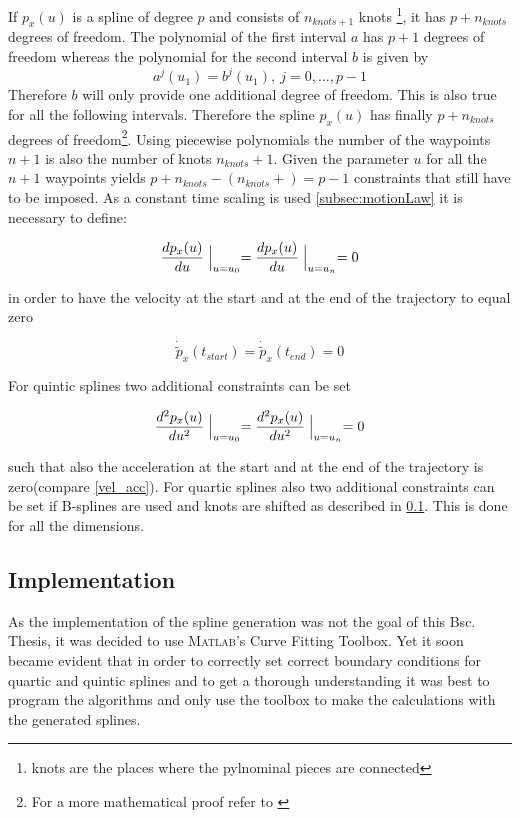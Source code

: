 If $p_x(u)$ is a spline of degree $p$ and consists of $n_{knots+1}$ knots \footnote{knots are the places where the pylnominal pieces are connected}, it has $p+n_{knots}$ degrees of freedom. The polynomial of the first interval $a$ has $p+1$ degrees of freedom whereas the polynomial for the second interval $b$ is given by
\begin{equation*}
a^{j}(u_1)=b^{j}(u_1),~j=0,...,p-1
\end{equation*}
Therefore $b$ will only provide one additional degree of freedom. This is also true for all the following intervals. Therefore the spline $p_x(u)$ has finally $p+n_{knots}$ degrees of freedom\footnote{For a more mathematical proof refer to \cite{dahmen}}. Using piecewise polynomials the number of the waypoints $n+1$ is also the number of knots $n_{knots}+1$. Given the parameter $u$ for all the $n+1$ waypoints yields $p+n_{knots}-(n_{knots}+) = p-1$ constraints that still have to be imposed. As a constant time scaling is used \ref{subsec:motionLaw} it is necessary to define:

\begin{equation*}
\frac{dp_x(u)}{du} \Bigm|_{u=u_0} = \frac{dp_x(u)}{du} \Bigm|_{u=u_n}=0
\end{equation*}

in order to have the velocity at the start and at the end of the trajectory to equal zero

\begin{equation*}
\dot{\tilde{p}}_x(t_{start}) = \dot{\tilde{p}}_x(t_{end})=0
\end{equation*}

For quintic splines two additional constraints can be set

\begin{equation*}
\frac{d^2p_x(u)}{du^2} \Bigm|_{u=u_0} = \frac{d^2p_x(u)}{du^2} \Bigm|_{u=u_n}=0
\end{equation*}

such that also the acceleration at the start and at the end of the trajectory is zero(compare \eqref{vel_acc}). For quartic splines also two additional constraints can be set if B-splines are used and knots are shifted as described in \ref{subsec:implementation}. This is done for all the dimensions.



\subsection{Implementation}
\label{subsec:implementation}
As the implementation of the spline generation was not the goal of this Bsc. Thesis, it was decided to use \textsc{Matlab}'s Curve Fitting Toolbox. Yet it soon became evident that in order to correctly set correct boundary conditions for quartic and quintic splines and to get a thorough understanding it was best to program the algorithms and only use the toolbox to make the calculations with the generated splines.\\

